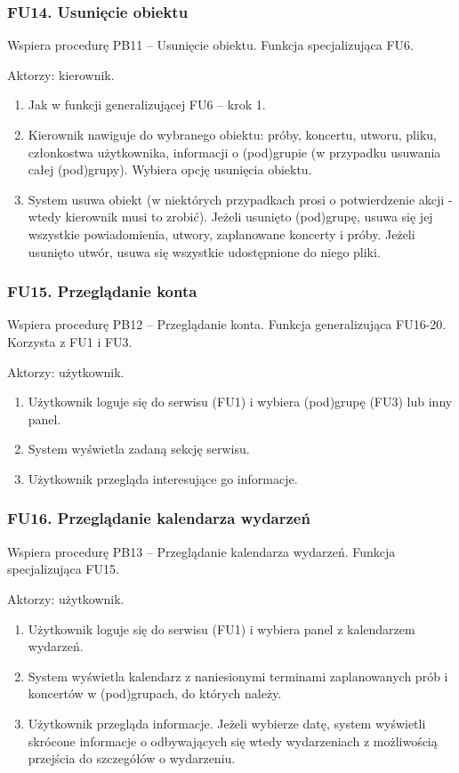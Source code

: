 \documentclass[11pt,a4paper]{article}
\renewcommand{\_}{\char`_}
\begin{document}
\subsubsection{FU14. Usunięcie obiektu}

Wspiera procedurę PB11 – Usunięcie obiektu. Funkcja specjalizująca FU6.

Aktorzy: kierownik.
\begin{enumerate}
    \item Jak w funkcji generalizującej FU6 – krok 1.
    \item Kierownik nawiguje do wybranego obiektu: próby, koncertu, utworu, pliku, członkostwa użytkownika, informacji o (pod)grupie (w przypadku usuwania całej (pod)grupy). Wybiera opcję usunięcia obiektu.
    \item System usuwa obiekt (w niektórych przypadkach prosi o potwierdzenie akcji - wtedy kierownik musi to zrobić). Jeżeli usunięto (pod)grupę, usuwa się jej wszystkie powiadomienia, utwory, zaplanowane koncerty i próby. Jeżeli usunięto utwór, usuwa się wszystkie udostępnione do niego pliki.
\end{enumerate}

\subsubsection{FU15. Przeglądanie konta}

Wspiera procedurę PB12 – Przeglądanie konta. Funkcja generalizująca FU16-20. Korzysta z FU1 i FU3.

Aktorzy: użytkownik.
\begin{enumerate}
    \item Użytkownik loguje się do serwisu (FU1) i wybiera (pod)grupę (FU3) lub inny panel.
    \item System wyświetla zadaną sekcję serwisu.
    \item Użytkownik przegląda interesujące go informacje.
\end{enumerate}


\subsubsection{FU16. Przeglądanie kalendarza wydarzeń}

Wspiera procedurę PB13 – Przeglądanie kalendarza wydarzeń. Funkcja specjalizująca FU15.

Aktorzy: użytkownik.
\begin{enumerate}
    \item Użytkownik loguje się do serwisu (FU1) i wybiera panel z kalendarzem wydarzeń.
    \item System wyświetla kalendarz z naniesionymi terminami zaplanowanych prób i koncertów w (pod)grupach, do których należy.
    \item Użytkownik przegląda informacje. Jeżeli wybierze datę, system wyświetli skrócone informacje o odbywających się wtedy wydarzeniach z możliwością przejścia do szczegółów o wydarzeniu.
\end{enumerate}
\end{document}
